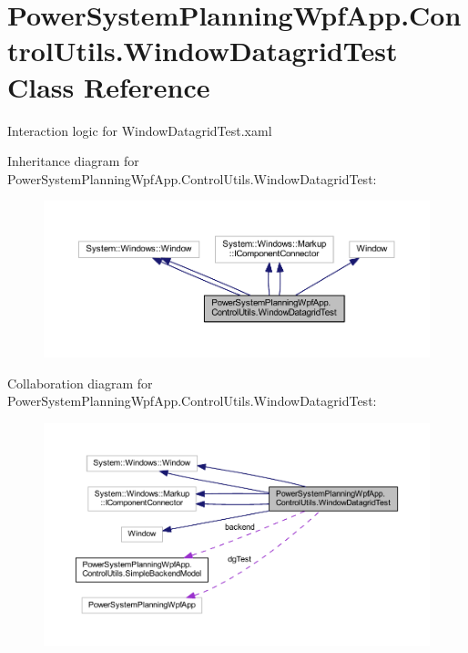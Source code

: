 \hypertarget{class_power_system_planning_wpf_app_1_1_control_utils_1_1_window_datagrid_test}{}\section{Power\+System\+Planning\+Wpf\+App.\+Control\+Utils.\+Window\+Datagrid\+Test Class Reference}
\label{class_power_system_planning_wpf_app_1_1_control_utils_1_1_window_datagrid_test}


Interaction logic for Window\+Datagrid\+Test.\+xaml  




Inheritance diagram for Power\+System\+Planning\+Wpf\+App.\+Control\+Utils.\+Window\+Datagrid\+Test\+:\nopagebreak
\begin{figure}[H]
\begin{center}
\leavevmode
\includegraphics[width=350pt]{class_power_system_planning_wpf_app_1_1_control_utils_1_1_window_datagrid_test__inherit__graph}
\end{center}
\end{figure}


Collaboration diagram for Power\+System\+Planning\+Wpf\+App.\+Control\+Utils.\+Window\+Datagrid\+Test\+:\nopagebreak
\begin{figure}[H]
\begin{center}
\leavevmode
\includegraphics[width=350pt]{class_power_system_planning_wpf_app_1_1_control_utils_1_1_window_datagrid_test__coll__graph}
\end{center}
\end{figure}
